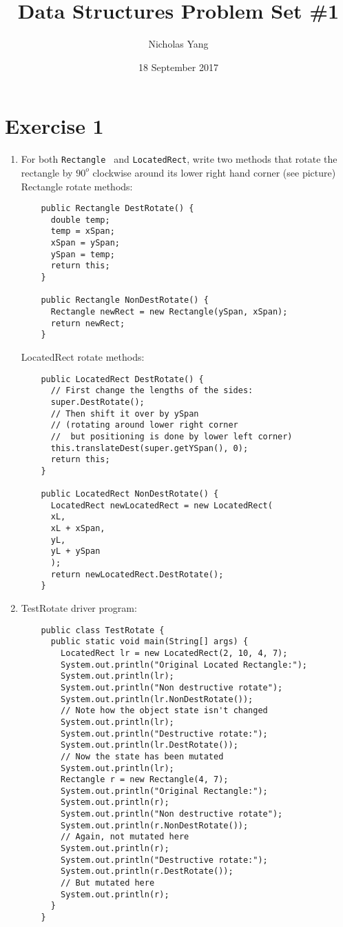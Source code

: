 \documentclass[12pt]{article}
\title{Data Structures Problem Set \#1}
\author{Nicholas Yang}
\date{18 September 2017}
\begin{document}
\maketitle
\section{Exercise 1}
\begin{enumerate}[label=(\alph*)]
\item For both {\tt Rectangle } and {\tt LocatedRect}, write two methods that rotate the rectangle by $90^o$
  clockwise around its lower right hand corner (see picture) \\

  Rectangle rotate methods:
  \begin{verbatim}
    public Rectangle DestRotate() {
      double temp;
      temp = xSpan;
      xSpan = ySpan;
      ySpan = temp;
      return this;
    }

    public Rectangle NonDestRotate() {
      Rectangle newRect = new Rectangle(ySpan, xSpan);
      return newRect;
    }
  \end{verbatim}
  LocatedRect rotate methods:
  \begin{verbatim}
    public LocatedRect DestRotate() {
      // First change the lengths of the sides:
      super.DestRotate();
      // Then shift it over by ySpan
      // (rotating around lower right corner
      //  but positioning is done by lower left corner)
      this.translateDest(super.getYSpan(), 0);
      return this;
    }

    public LocatedRect NonDestRotate() {
      LocatedRect newLocatedRect = new LocatedRect(
      xL,
      xL + xSpan,
      yL,
      yL + ySpan
      );
      return newLocatedRect.DestRotate();
    }
  \end{verbatim}

\item TestRotate driver program:
  \begin{verbatim}
    public class TestRotate {
      public static void main(String[] args) {
        LocatedRect lr = new LocatedRect(2, 10, 4, 7);
        System.out.println("Original Located Rectangle:");
        System.out.println(lr);
        System.out.println("Non destructive rotate");
        System.out.println(lr.NonDestRotate());
        // Note how the object state isn't changed
        System.out.println(lr);
        System.out.println("Destructive rotate:");
        System.out.println(lr.DestRotate());
        // Now the state has been mutated
        System.out.println(lr);
        Rectangle r = new Rectangle(4, 7);
        System.out.println("Original Rectangle:");
        System.out.println(r);
        System.out.println("Non destructive rotate");
        System.out.println(r.NonDestRotate());
        // Again, not mutated here
        System.out.println(r);
        System.out.println("Destructive rotate:");
        System.out.println(r.DestRotate());
        // But mutated here
        System.out.println(r);
      }
    }
  \end{verbatim}
\end{enumerate}
\end{document}
